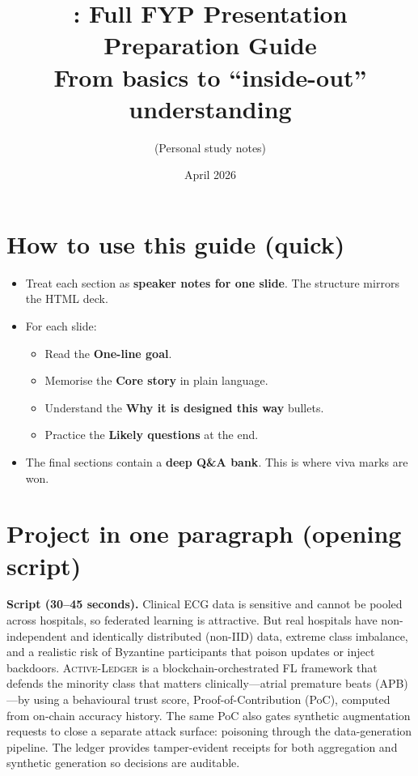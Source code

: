 \documentclass[11pt,a4paper]{article}
\title{\actledger: Full FYP Presentation Preparation Guide\\
\large From basics to ``inside-out'' understanding}
\author{(Personal study notes)}
\date{April 2026}
\newcommand{\actledger}{\textsc{Active-Ledger}\xspace}
\begin{document}
\maketitle

\tableofcontents
\newpage

\section{How to use this guide (quick)}

\begin{itemize}
\item Treat each section as \textbf{speaker notes for one slide}. The structure mirrors the HTML deck.
\item For each slide:
  \begin{itemize}
  \item Read the \textbf{One-line goal}.
  \item Memorise the \textbf{Core story} in plain language.
  \item Understand the \textbf{Why it is designed this way} bullets.
  \item Practice the \textbf{Likely questions} at the end.
  \end{itemize}
\item The final sections contain a \textbf{deep Q\&A bank}. This is where viva marks are won.
\end{itemize}

\section{Project in one paragraph (opening script)}

\textbf{Script (30--45 seconds).}
Clinical ECG data is sensitive and cannot be pooled across hospitals, so federated learning is attractive. But real hospitals have non-independent and identically distributed (non-IID) data, extreme class imbalance, and a realistic risk of Byzantine participants that poison updates or inject backdoors. \actledger is a blockchain-orchestrated FL framework that defends the minority class that matters clinically---atrial premature beats (APB)---by using a behavioural trust score, Proof-of-Contribution (PoC), computed from on-chain accuracy history. The same PoC also gates synthetic augmentation requests to close a separate attack surface: poisoning through the data-generation pipeline. The ledger provides tamper-evident receipts for both aggregation and synthetic generation so decisions are auditable.
\end{document}
